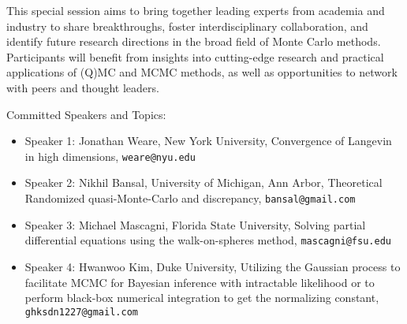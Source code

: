 \begin{talk}
This special session aims to bring together leading experts from academia and industry to share breakthroughs, foster interdisciplinary collaboration, and identify future research directions in the broad field of Monte Carlo methods. Participants will benefit from insights into cutting-edge research and practical applications of (Q)MC and MCMC methods, as well as opportunities to network with peers and thought leaders.


Committed Speakers and Topics:
\begin{itemize}

\item Speaker 1: Jonathan Weare, New York University, Convergence of Langevin in high dimensions, \texttt{weare@nyu.edu}
    
\item Speaker 2: Nikhil Bansal, University of Michigan, Ann Arbor, Theoretical Randomized quasi-Monte-Carlo and discrepancy, \texttt{bansal@gmail.com}
    
\item Speaker 3: Michael Mascagni, Florida State University, Solving partial differential equations using the walk-on-spheres method, \texttt{mascagni@fsu.edu}
    
\item Speaker 4: Hwanwoo Kim, Duke University, Utilizing the Gaussian process to facilitate MCMC for Bayesian inference with intractable likelihood or to perform black-box numerical integration to get the normalizing constant, \texttt{ghksdn1227@gmail.com}
\end{itemize}



\begin{comment}
If you would like to include references, please do so by creating a simple list numbered by [1], [2], [3], \ldots. See example below.
Please do not use the \texttt{bibliography} environment or \texttt{bibtex} files.
\begin{enumerate}
	
\item[{[1]}] Niederreiter, Harald (1992). {\it Random number generation and quasi-Monte Carlo methods}. Society for Industrial and Applied Mathematics (SIAM).
	
\item[{[2]}] Roberts, Gareth O, \& Rosenthal, Jeffrey S. (2002).  Optimal scaling for various Metropolis-Hastings algorithms, \textbf{16}(4), 351--367.
\end{enumerate}

Equations may be used if they are referenced. Please note that the equation numbers may be different (but will be cross-referenced correctly) in the final program book.
\end{comment}
\end{talk}

